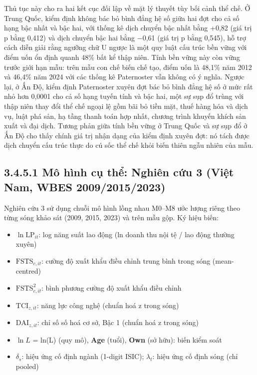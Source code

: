 \documentclass[
  a4paper,
  13pt]{extreport}
\providecommand{\tightlist}{%
  \setlength{\itemsep}{0pt}\setlength{\parskip}{0pt}}
\begin{document}
Thủ tục này cho ra hai kết cục đối lập về mặt lý thuyết tùy bối cảnh thể
chế. Ở Trung Quốc, kiểm định không bác bỏ bình đẳng hệ số giữa hai đợt
cho cả số hạng bậc nhất và bậc hai, với thống kê dịch chuyển bậc nhất
bằng +0,82 (giá trị p bằng 0,412) và dịch chuyển bậc hai bằng −0,61 (giá
trị p bằng 0,545), hỗ trợ cách diễn giải rằng ngưỡng chữ U ngược là một
quy luật cấu trúc bền vững với điểm uốn ổn định quanh 48\% bất kể thập
niên. Tính bền vững này còn vững trước giới hạn mẫu: trên mẫu con chế
biến chế tạo, điểm uốn là 48,1\% năm 2012 và 46,4\% năm 2024 với các
thống kê Paternoster vẫn không có ý nghĩa. Ngược lại, ở Ấn Độ, kiểm định
Paternoster xuyên đợt bác bỏ bình đẳng hệ số ở mức rất nhỏ hơn 0,0001
cho cả số hạng tuyến tính và bậc hai, một sự sụp đổ trùng với thập niên
thay đổi thể chế ngoại lệ gồm bãi bỏ tiền mặt, thuế hàng hóa và dịch vụ,
luật phá sản, hạ tầng thanh toán hợp nhất, chương trình khuyến khích sản
xuất và đại dịch. Tương phản giữa tính bền vững ở Trung Quốc và sự sụp
đổ ở Ấn Độ cho thấy chính giá trị nhận dạng của kiểm định xuyên đợt: nó
tách được dịch chuyển cấu trúc thực do cú sốc thể chế khỏi biến thiên
ngẫu nhiên của mẫu.

\hypertarget{muxf4-huxecnh-cux1ee5-thux1ec3-nghiuxean-cux1ee9u-3-viux1ec7t-nam-wbes-200920152023}{%
\subsection{3.4.5.1 Mô hình cụ thể: Nghiên cứu 3 (Việt Nam, WBES
2009/2015/2023)}\label{muxf4-huxecnh-cux1ee5-thux1ec3-nghiuxean-cux1ee9u-3-viux1ec7t-nam-wbes-200920152023}}

Nghiên cứu 3 sử dụng chuỗi mô hình lồng nhau M0--M8 ước lượng riêng theo
từng sóng khảo sát (2009, 2015, 2023) và trên mẫu gộp. Ký hiệu biến:

\begin{itemize}
\tightlist
\item
  \textbf{\(\ln\mathrm{LP}_{it}\)}: log năng suất lao động (ln doanh thu
  nội tệ / lao động thường xuyên)
\item
  \textbf{\(\mathrm{FSTS}_{c,it}\)}: cường độ xuất khẩu điều chỉnh trung
  bình trong sóng (mean-centred)
\item
  \textbf{\(\mathrm{FSTS}_{c,it}^{2}\)}: bình phương cường độ xuất khẩu
  điều chỉnh
\item
  \textbf{\(\mathrm{TCI}_{z,it}\)}: năng lực công nghệ (chuẩn hoá z
  trong sóng)
\item
  \textbf{\(\mathrm{DAI}_{z,it}\)}: chỉ số số hoá cơ sở, Bậc 1 (chuẩn
  hoá z trong sóng)
\item
  \textbf{\(\ln L\)} = ln(L) (quy mô), \textbf{Age} (tuổi), \textbf{Own}
  (sở hữu): biến kiểm soát
\item
  \textbf{\(\delta_s\)}: hiệu ứng cố định ngành (1-digit ISIC);
  \textbf{\(\lambda_t\)}: hiệu ứng cố định sóng (chỉ pooled)
\end{itemize}
\end{document}
